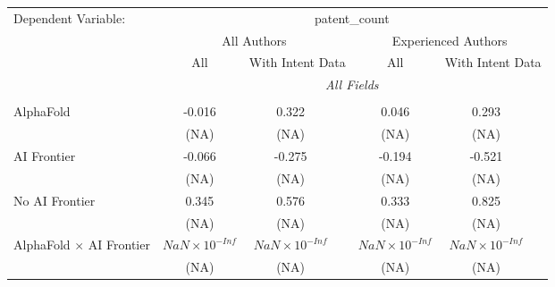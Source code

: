 \begingroup
\centering
\begin{tabular}{lcccccc}
   \tabularnewline \midrule \midrule
   Dependent Variable: & \multicolumn{6}{c}{patent\_count}\\
 & \multicolumn{3}{c}{All Authors} & \multicolumn{3}{c}{Experienced Authors} \\
\cmidrule(lr){2-4} \cmidrule(lr){5-7}
 & \multicolumn{1}{c}{All} & \multicolumn{2}{c}{With Intent Data} & \multicolumn{1}{c}{All} & \multicolumn{2}{c}{With Intent Data} \\
\cmidrule(lr){2-2} \cmidrule(lr){3-4} \cmidrule(lr){5-5} \cmidrule(lr){6-7}
 & \multicolumn{6}{c}{\textit{All Fields}} \\ \\
   AlphaFold                                                                  & -0.016                 & 0.322                  &                        & 0.046                  & 0.293                  &   \\   
                                                                              & (NA)                   & (NA)                   &                        & (NA)                   & (NA)                   &   \\   
   AI Frontier                                                                & -0.066                 & -0.275                 &                        & -0.194                 & -0.521                 &   \\   
                                                                              & (NA)                   & (NA)                   &                        & (NA)                   & (NA)                   &   \\   
   No AI Frontier                                                             & 0.345                  & 0.576                  &                        & 0.333                  & 0.825                  &   \\   
                                                                              & (NA)                   & (NA)                   &                        & (NA)                   & (NA)                   &   \\   
   AlphaFold $\times$ AI Frontier                                             & $NaN\times 10^{-Inf}$  & $NaN\times 10^{-Inf}$  &                        & $NaN\times 10^{-Inf}$  & $NaN\times 10^{-Inf}$  &   \\   
                                                                              & (NA)                   & (NA)                   &                        & (NA)                   & (NA)                   &   \\   

\end{tabular}
